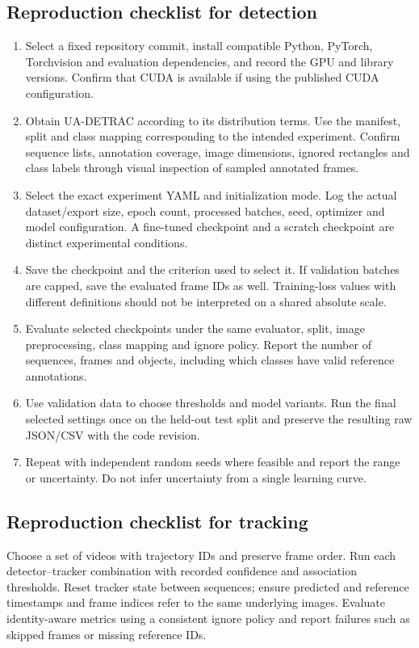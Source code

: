 \subsection{Reproduction checklist for detection}
\begin{enumerate}
\item Select a fixed repository commit, install compatible Python, PyTorch, Torchvision and evaluation dependencies, and record the GPU and library versions. Confirm that CUDA is available if using the published CUDA configuration.
\item Obtain UA-DETRAC according to its distribution terms. Use the manifest, split and class mapping corresponding to the intended experiment. Confirm sequence lists, annotation coverage, image dimensions, ignored rectangles and class labels through visual inspection of sampled annotated frames.
\item Select the exact experiment YAML and initialization mode. Log the actual dataset/export size, epoch count, processed batches, seed, optimizer and model configuration. A fine-tuned checkpoint and a scratch checkpoint are distinct experimental conditions.
\item Save the checkpoint and the criterion used to select it. If validation batches are capped, save the evaluated frame IDs as well. Training-loss values with different definitions should not be interpreted on a shared absolute scale.
\item Evaluate selected checkpoints under the same evaluator, split, image preprocessing, class mapping and ignore policy. Report the number of sequences, frames and objects, including which classes have valid reference annotations.
\item Use validation data to choose thresholds and model variants. Run the final selected settings once on the held-out test split and preserve the resulting raw JSON/CSV with the code revision.
\item Repeat with independent random seeds where feasible and report the range or uncertainty. Do not infer uncertainty from a single learning curve.
\end{enumerate}

\subsection{Reproduction checklist for tracking}
Choose a set of videos with trajectory IDs and preserve frame order. Run each detector--tracker combination with recorded confidence and association thresholds. Reset tracker state between sequences; ensure predicted and reference timestamps and frame indices refer to the same underlying images. Evaluate identity-aware metrics using a consistent ignore policy and report failures such as skipped frames or missing reference IDs.


